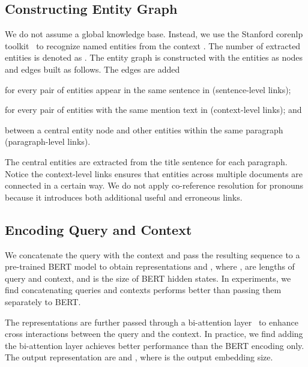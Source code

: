 \documentclass[11pt,a4paper]{article}
\begin{document}
\subsection{Constructing Entity Graph}
We do not assume a global knowledge base. 
Instead, we use the Stanford corenlp toolkit~\cite{manning2014stanford} to recognize named entities from the context . 
The number of extracted entities is denoted as .
The entity graph is constructed with the entities as nodes and edges built as follows. 
The edges are added
\begin{inparaenum}
\item for every pair of entities appear in the same sentence in  (sentence-level links);
\item for every pair of entities with the same mention text in  (context-level links);
and 
\item between a central entity node and other entities within the same paragraph (paragraph-level links).
\end{inparaenum}
The central entities are extracted from the title sentence for each paragraph.
Notice the context-level links ensures that entities across multiple documents are connected in a certain way. 
We do not apply co-reference resolution for pronouns because it introduces both additional useful and erroneous links. 










\subsection{Encoding Query and Context}
We concatenate the query  with the context  
and pass the resulting sequence to a pre-trained BERT model to obtain representations
 and , 
where , are lengths of query and context,  and  is the size of BERT hidden states. 
In experiments, we find concatenating queries and contexts performs better than passing them separately to BERT.

The representations are further passed through a  bi-attention layer~\cite{seo2016bidirectional} to enhance cross interactions between the query and the context. 
In practice, we find adding the bi-attention layer achieves better performance than the BERT encoding only. 
The output representation are  and , where  is the output embedding size.
\end{document}
